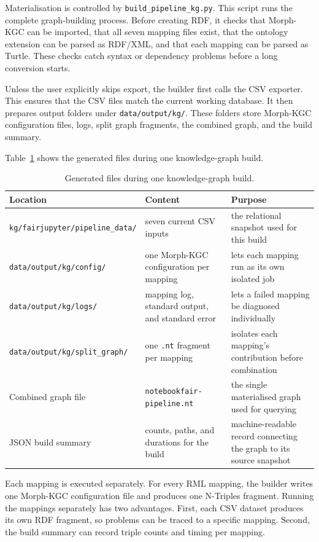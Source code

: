 Materialisation is controlled by \texttt{build\_pipeline\_kg.py}. This script runs the complete graph-building process. Before creating RDF, it checks that Morph-KGC can be imported, that all seven mapping files exist, that the ontology extension can be parsed as RDF/XML, and that each mapping can be parsed as Turtle. These checks catch syntax or dependency problems before a long conversion starts.

Unless the user explicitly skips export, the builder first calls the CSV exporter. This ensures that the CSV files match the current working database. It then prepares output folders under \texttt{data/output/kg/}. These folders store Morph-KGC configuration files, logs, split graph fragments, the combined graph, and the build summary.

Table~\ref{tab:kg-generated-files} shows the generated files during one knowledge-graph build.

\begin{table}[ht]
\centering
\caption{Generated files during one knowledge-graph build.}
\label{tab:kg-generated-files}
\small
\begin{tabularx}{\textwidth}{@{}p{5.1cm}p{4.4cm}X@{}}
\toprule
Location & Content & Purpose\tabularnewline
\midrule
\texttt{kg/fairjupyter/pipeline\_data/} & seven current CSV inputs & the relational snapshot used for this build\tabularnewline
\texttt{data/output/kg/config/} & one Morph-KGC configuration per mapping & lets each mapping run as its own isolated job\tabularnewline
\texttt{data/output/kg/logs/} & mapping log, standard output, and standard error & lets a failed mapping be diagnosed individually\tabularnewline
\texttt{data/output/kg/split\_graph/} & one \texttt{.nt} fragment per mapping & isolates each mapping's contribution before combination\tabularnewline
Combined graph file & \texttt{notebookfair-pipeline.nt} & the single materialised graph used for querying\tabularnewline
JSON build summary & counts, paths, and durations for the build & machine-readable record connecting the graph to its source snapshot\tabularnewline
\bottomrule
\end{tabularx}
\end{table}

Each mapping is executed separately. For every RML mapping, the builder writes one Morph-KGC configuration file and produces one N-Triples fragment. Running the mappings separately has two advantages. First, each CSV dataset produces its own RDF fragment, so problems can be traced to a specific mapping. Second, the build summary can record triple counts and timing per mapping.

